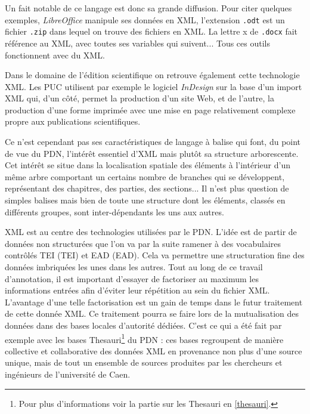 \documentclass[a4paper,12pt,twoside]{book}
\begin{document}
    
   Un fait notable de ce langage est donc sa grande diffusion. Pour citer quelques exemples, \textit{LibreOffice} manipule ses données en \acrshort{XML}, l'extension \texttt{.odt} est un fichier \texttt{.zip} dans lequel on trouve des fichiers en \acrshort{XML}. La lettre \og x \fg{} de \texttt{.docx} fait référence au \acrshort{XML}, avec toutes ses variables qui suivent... Tous ces outils fonctionnent avec du XML.
   
   Dans le domaine de l'édition scientifique on retrouve également cette technologie XML. Les \acrshort{PUC} utilisent par exemple le logiciel \textit{InDesign} sur la base d'un import \acrshort{XML} qui, d'un côté, permet la production d'un site Web, et de l'autre, la production d'une forme imprimée avec une mise en page relativement complexe propre aux publications scientifiques.
    
    Ce n'est cependant pas ses caractéristiques de langage à balise qui font, du point de vue du \acrshort{PDN}, l'intérêt essentiel d'\acrshort{XML} mais plutôt sa structure arborescente. Cet intérêt se situe dans la localisation \og spatiale \fg{} des éléments à l'intérieur d'un même arbre comportant un certains nombre de branches qui se développent, représentant des chapitres, des parties, des sections... Il n'est plus question de simples balises mais bien de toute une structure dont les éléments, classés en différents groupes, sont inter-dépendants les uns aux autres.
    
   \acrshort{XML} est au centre des technologies utilisées par le \acrshort{PDN}. L'idée est de partir de données non structurées que l'on va par la suite ramener à des vocabulaires contrôlés \acrshort{TEI} (\acrlong{TEI}) et \acrshort{EAD} (\acrlong{EAD}). Cela va permettre une structuration fine des données imbriquées les unes dans les autres. Tout au long de ce travail d'annotation, il est important d'essayer de factoriser au maximum les informations entrées afin d'éviter leur répétition au sein du fichier XML. L'avantage d'une telle factorisation est un gain de temps dans le futur traitement de cette donnée XML. Ce traitement pourra se faire lors de la mutualisation des données dans des bases locales d'autorité dédiées. C'est ce qui a été fait par exemple avec les bases Thesauri\footnote{Pour plus d'informations voir la partie sur les Thesauri en \ref{thesauri}.} du \acrshort{PDN} : ces bases regroupent de manière collective et collaborative des données XML en provenance non plus d'une source unique, mais de tout un ensemble de sources produites par les chercheurs et ingénieurs de l'université de Caen.
   
\end{document}
